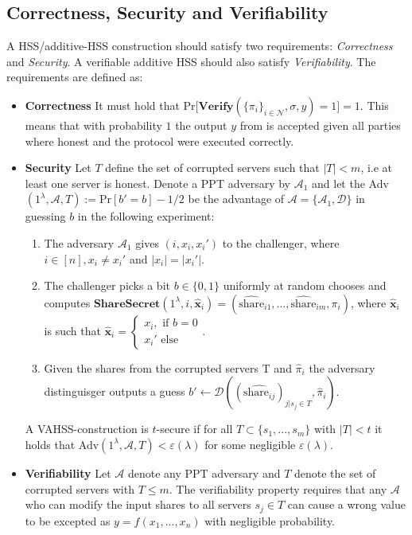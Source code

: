 \subsection*{Correctness, Security and Verifiability}
A HSS/additive-HSS construction should satisfy  two requirements: \textit{Correctness} and \textit{Security}. A verifiable additive HSS should also satisfy \textit{Verifiability}. The requirements are defined as:
\begin{itemize}
    \item \textbf{Correctness} It must hold that Pr$\Big[\textbf{Verify}(\{\pi_i\}_{i\in\mathcal{N}},\sigma,y)=1\Big]=1$. This means that with probability $1$ the output $y$ from  is accepted given all parties where honest and the protocol were executed correctly.
    \item \textbf{Security} Let $T$ define the set of corrupted servers such that $|T|<m$, i.e at least one server is honest.  Denote a PPT adversary by $\mathcal{A}_1$ and let the Adv$(1^\lambda,\mathcal{A},T):= \text{Pr}[b' = b]-1/2$ be the advantage of $\mathcal{A}=\{\mathcal{A}_1,\mathcal{D}\}$ in guessing $b$ in the following experiment:
    \begin{enumerate}
        \item The adversary $\mathcal{A}_1$ gives $(i,x_i,x_i')$ to the challenger, where $i\in[n], x_i\neq x_i'$ and $|x_i|=|x_i'|$.
        \item The challenger picks a bit $b\in\{0,1\}$ uniformly at random chooses and computes $\textbf{ShareSecret}(1^\lambda,i,\hat{\mathbf{x}}_i) = (\hat{\text{share}}_{i1},...,\hat{\text{share}}_{im},\pi_i)$, where $\hat{\textbf{x}}_i$ is  such that $\hat{\textbf{x}}_i = \begin{cases}x_i, \text{ if } b=0 \\ x_i' \text{ else} \end{cases}$. 
        \item Given the shares from the corrupted servers T and $\hat{\pi}_i$ the adversary distinguisger outputs a guess $b'\xleftarrow[]{}\mathcal{D}((\hat{\text{share}_{ij}})_{j|s_j\in T},\hat{\pi}_i)$.
    \end{enumerate}
    A VAHSS-construction is $t$-secure if for all $T\subset \{s_1,...,s_m\}$ with $|T|<t$ it holds that Adv$(1^\lambda,\mathcal{A},T)<\varepsilon(\lambda)$ for some negligible $\varepsilon(\lambda)$.
 \item \textbf{Verifiability} Let $\mathcal{A}$ denote any PPT  adversary and $T$ denote the set of corrupted servers with $T\leq m$. The verifiability property requires that any $\mathcal{A}$ who can modify the input shares to all servers $s_j\in T$ can cause a wrong value to be excepted as $y=f(x_1,...,x_n)$ with negligible probability.   
\end{itemize}
